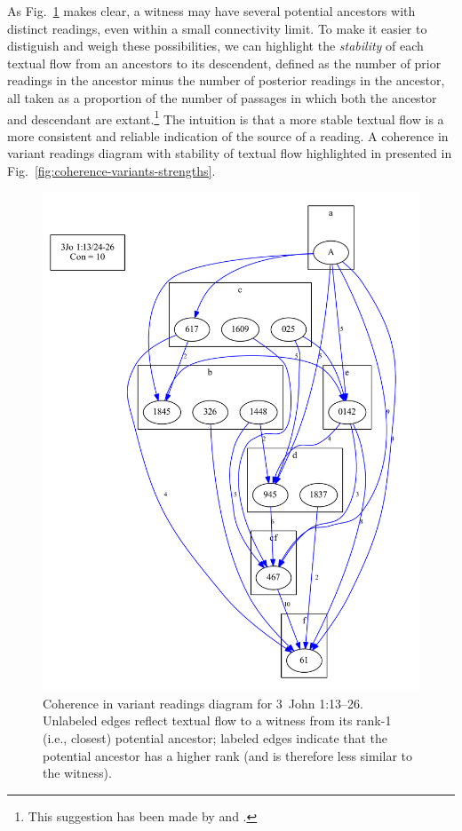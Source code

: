 \documentclass[a4paper, 12pt]{article}
\begin{document}
	As Fig.~\ref{fig:coherence-variants} makes clear, a witness may have several potential ancestors with distinct readings, even within a small connectivity limit. To make it easier to distiguish and weigh these possibilities, we can highlight the \emph{stability} of each textual flow from an ancestors to its descendent, defined as the number of prior readings in the ancestor minus the number of posterior readings in the ancestor, all taken as a proportion of the number of passages in which both the ancestor and descendant are extant.\footnote{This suggestion has been made by \cite[55--57]{Mink04} and \cite[273--279]{Edmondson19}.} The intuition is that a more stable textual flow is a more consistent and reliable indication of the source of a reading. A coherence in variant readings diagram with stability of textual flow highlighted in presented in Fig.~\ref{fig:coherence-variants-strengths}.
	
	\newpage
	
	\begin{figure}[h!]
		\centering
		\includegraphics[scale=0.65]{../graphics/B25K1V13U24-26-coherence-variants.pdf}
		\caption{Coherence in variant readings diagram for 3~John 1:13–26. Unlabeled edges reflect textual flow to a witness from its rank-1 (i.e., closest) potential ancestor; labeled edges indicate that the potential ancestor has a higher rank (and is therefore less similar to the witness).}
		\label{fig:coherence-variants}
	\end{figure}
	
\end{document}
